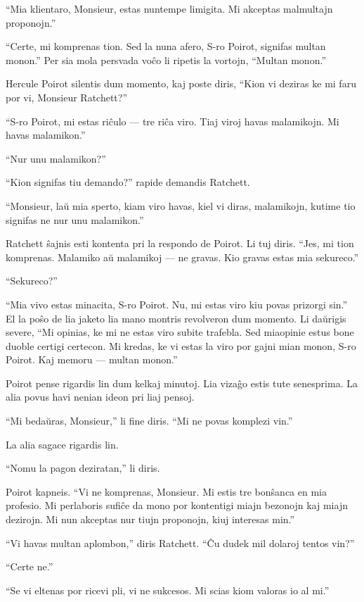 ``Mia klientaro, Monsieur, estas nuntempe limigita. Mi akceptas malmultajn proponojn.''

``Certe, mi komprenas tion. Sed la nuna afero, S-ro Poirot, signifas multan monon.'' Per sia mola persvada voĉo li ripetis la vortojn, ``Multan monon.''

Hercule Poirot silentis dum momento, kaj poste diris, ``Kion vi deziras ke mi faru por vi, Monsieur Ratchett?''

``S-ro Poirot, mi estas riĉulo --- tre riĉa viro. Tiaj viroj havas malamikojn. Mi havas malamikon.''

``Nur unu malamikon?''

``Kion signifas tiu demando?'' rapide demandis Ratchett.

``Monsieur, laŭ mia sperto, kiam viro havas, kiel vi diras, malamikojn, kutime tio signifas ne nur unu malamikon.''

Ratchett ŝajnis esti kontenta pri la respondo de Poirot. Li tuj diris. ``Jes, mi tion komprenas. Malamiko aŭ malamikoj --- ne gravas. Kio gravas estas mia sekureco.''

``Sekureco?''

``Mia vivo estas minacita, S-ro Poirot. Nu, mi estas viro kiu povas prizorgi sin.'' El la poŝo de lia jaketo lia mano montris revolveron dum momento. Li daŭrigis severe, ``Mi opinias, ke mi ne estas viro subite trafebla. Sed miaopinie estus bone duoble certigi certecon. Mi kredas, ke vi estas la viro por gajni mian monon, S-ro Poirot. Kaj memoru --- multan monon.''

Poirot pense rigardis lin dum kelkaj minutoj. Lia vizaĝo estis tute senesprima. La alia povus havi nenian ideon pri liaj pensoj.

``Mi bedaŭras, Monsieur,'' li fine diris. ``Mi ne povas komplezi vin.''

La alia sagace rigardis lin.

``Nomu la pagon deziratan,'' li diris.

Poirot kapneis. ``Vi ne komprenas, Monsieur. Mi estis tre bonŝanca en mia profesio. Mi perlaboris sufiĉe da mono por kontentigi miajn bezonojn kaj miajn dezirojn. Mi nun akceptas nur tiujn proponojn, kiuj interesas min.''

``Vi havas multan aplombon,'' diris Ratchett. ``Ĉu dudek mil dolaroj tentos vin?''

``Certe ne.''

``Se vi eltenas por ricevi pli, vi ne sukcesos. Mi scias kiom valoras io al mi.''

